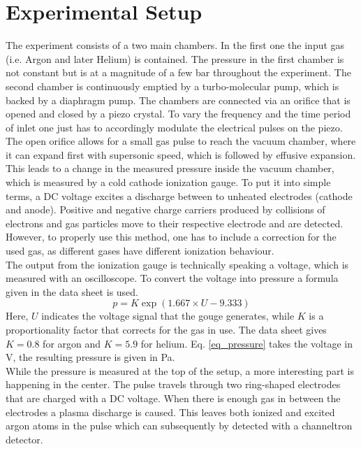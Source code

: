 \documentclass[a4paper,10pt]{article}
\begin{document}
\section{Experimental Setup}
The experiment consists of a two main chambers. In the first one the input gas (i.e. Argon and later Helium) is contained. The pressure in the first chamber is not constant but is at a magnitude of a few \si{\bar} throughout the experiment. The second chamber is continuously emptied by a turbo-molecular pump, which is backed by a diaphragm pump. The chambers are connected via an orifice that is opened and closed by a piezo crystal. To vary the frequency and the time period of inlet one just has to accordingly modulate the electrical pulses on the piezo.
\newline
The open orifice allows for a small gas pulse to reach the vacuum chamber, where it can expand first with supersonic speed, which is followed by effusive expansion. This leads to a change in the measured pressure inside the vacuum chamber, which is measured by a cold cathode ionization gauge.\cite{cold_cathode} To put it into simple terms, a DC voltage excites a discharge between to unheated electrodes (cathode and anode). Positive and negative charge carriers produced by collisions of electrons and gas particles move to their respective electrode and are detected. However, to properly use this method, one has to include a correction for the used gas, as different gases have different ionization behaviour.
\\
The output from the ionization gauge is technically speaking a voltage, which is measured with an oscilloscope. To convert the voltage into pressure a formula given in the data sheet \cite{datasheet_pfeiffer} is used. 
\begin{equation}
	\label{eq_pressure}
	p = K \exp(1.667 \times U - 9.333)
\end{equation}
Here, $U$ indicates the voltage signal that the gouge generates, while $K$ is a proportionality factor that corrects for the gas in use. The data sheet gives $K= 0.8$ for argon and $K = 5.9$ for helium. Eq. \ref{eq_pressure} takes the voltage in \si{\volt}, the resulting pressure is given in \si{\pascal}.
\\
While the pressure is measured at the top of the setup, a more interesting part is happening in the center. The pulse travels through two ring-shaped electrodes that are charged with a DC voltage. When there is enough gas in between the electrodes a plasma discharge is caused. This leaves both ionized and excited argon atoms in the pulse which can subsequently by detected with a channeltron detector.
\end{document}
